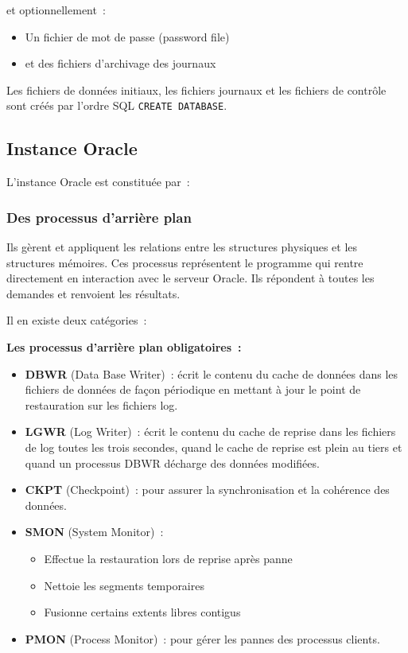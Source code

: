 \documentclass[12pt,a4paper]{report}
\begin{document}
et optionnellement~:
\begin{itemize}[leftmargin=*]
  \item Un fichier de mot de passe (password file)
  \item et des fichiers d'archivage des journaux
\end{itemize}

Les fichiers de données initiaux, les fichiers journaux et les fichiers de contrôle
sont créés par l'ordre SQL \lstinline|CREATE DATABASE|.

\subsection{Instance Oracle}

L'instance Oracle est constituée par~:

\subsubsection{Des processus d'arrière plan}

Ils gèrent et appliquent les relations entre les structures physiques et les
structures mémoires. Ces processus représentent le programme qui rentre directement
en interaction avec le serveur Oracle. Ils répondent à toutes les demandes et
renvoient les résultats.

Il en existe deux catégories~:

\medskip
\noindent\textbf{Les processus d'arrière plan obligatoires~:}

\begin{itemize}[leftmargin=*]
  \item \textbf{DBWR} (Data Base Writer)~: écrit le contenu du cache de données dans
        les fichiers de données de façon périodique en mettant à jour le point de
        restauration sur les fichiers log.
  \item \textbf{LGWR} (Log Writer)~: écrit le contenu du cache de reprise dans les
        fichiers de log toutes les trois secondes, quand le cache de reprise est
        plein au tiers et quand un processus DBWR décharge des données modifiées.
  \item \textbf{CKPT} (Checkpoint)~: pour assurer la synchronisation et la
        cohérence des données.
  \item \textbf{SMON} (System Monitor)~:
    \begin{itemize}
      \item Effectue la restauration lors de reprise après panne
      \item Nettoie les segments temporaires
      \item Fusionne certains extents libres contigus
    \end{itemize}
  \item \textbf{PMON} (Process Monitor)~: pour gérer les pannes des processus
        clients.
\end{itemize}
\end{document}
